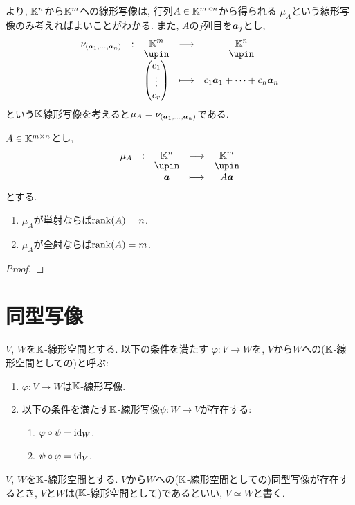\begin{remark}
より,
$\mathbb{K}^n$から$\mathbb{K}^m$への線形写像は,
行列$A\in\mathbb{K}^{m\times n}$から得られる
$\mu_A$という線形写像のみ考えればよいことがわかる.
また, $A$の$j$列目を$\boldsymbol{a}_j$とし,
\begin{align*}
\shazo{\nu_{(\aaa_1,\ldots,\aaa_n)}}{\KK^m}{\KK^n}
      {\begin{pmatrix}c_1\\\vdots\\c_r\end{pmatrix}}{c_1\aaa_1+\cdots+c_n\aaa_n}
\end{align*}
という$\mathbb{K}$線形写像を考えると$\mu_A=\nu_{(\boldsymbol{a}_1,\ldots,\boldsymbol{a}_n)}$である.
\end{remark}

\begin{prop}
$A\in\mathbb{K}^{m\times n}$とし,
\begin{align*}
\shazo{\mu_A}{\KK^n}{\KK^m}
{\aaa}{A\aaa}
\end{align*}
とする.
\begin{enumerate}
\item $\mu_A$が単射ならば$\operatorname{rank}(A)=n$.
\item $\mu_A$が全射ならば$\operatorname{rank}(A)=m$.
\end{enumerate}
\end{prop}
\begin{proof}\end{proof}

\section{同型写像}
\label{sec:iso:def}

\begin{definition}
  $V$, $W$を$\mathbb{K}$-線形空間とする.
  以下の条件を満たす
  $\varphi\colon V\to W$を,
  $V$から$W$への($\mathbb{K}$-線形空間としての)と呼ぶ:
  \begin{enumerate}
  \item $\varphi\colon V\to W$は$\mathbb{K}$-線形写像.
  \item 以下の条件を満たす$\mathbb{K}$-線形写像$\psi\colon W \to V$が存在する:
    \begin{enumerate}
      \item $\varphi\circ \psi=\operatorname{id}_W$.
      \item $\psi\circ \varphi=\operatorname{id}_V$.
    \end{enumerate}
  \end{enumerate}
\end{definition}
\begin{definition}
  $V$, $W$を$\mathbb{K}$-線形空間とする.
  $V$から$W$への($\mathbb{K}$-線形空間としての)同型写像が存在するとき,
  $V$と$W$は($\mathbb{K}$-線形空間として)であるといい,  
  $V\simeq W$と書く.
\end{definition}

